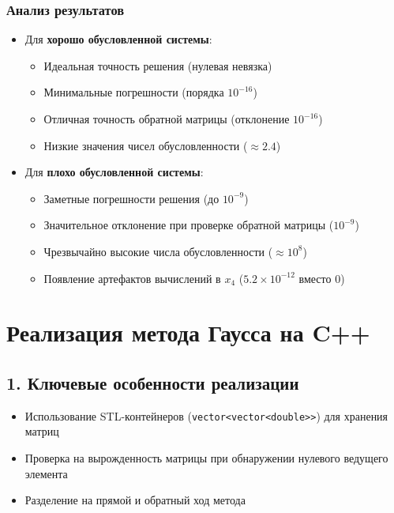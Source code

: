 \documentclass[12pt, a4paper]{article}
\begin{document}
\subsubsection*{Анализ результатов}
\begin{itemize}
\item Для \textbf{хорошо обусловленной системы}:
\begin{itemize}
\item Идеальная точность решения (нулевая невязка)
\item Минимальные погрешности (порядка $10^{-16}$)
\item Отличная точность обратной матрицы (отклонение $10^{-16}$)
\item Низкие значения чисел обусловленности ($\approx 2.4$)
\end{itemize}

\item Для \textbf{плохо обусловленной системы}:
\begin{itemize}
\item Заметные погрешности решения (до $10^{-9}$)
\item Значительное отклонение при проверке обратной матрицы ($10^{-9}$)
\item Чрезвычайно высокие числа обусловленности ($\approx 10^8$)
\item Появление артефактов вычислений в $x_4$ ($5.2 \times 10^{-12}$ вместо 0)
\end{itemize}
\end{itemize}

\section*{Реализация метода Гаусса на C++}
\subsection*{1. Ключевые особенности реализации}

\begin{itemize}
\item Использование STL-контейнеров (\texttt{vector<vector<double>>}) для хранения матриц
\item Проверка на вырожденность матрицы при обнаружении нулевого ведущего элемента
\item Разделение на прямой и обратный ход метода
\end{itemize}
\end{document}
